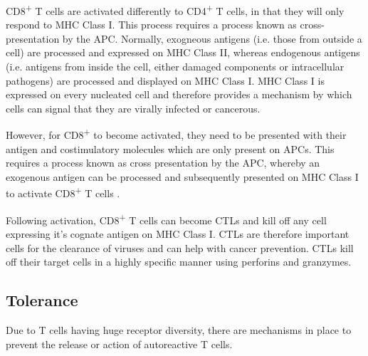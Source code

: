 CD8\textsuperscript{+} T cells are activated differently to CD4\textsuperscript{+} T cells, in that they will only respond to MHC Class I.
This process requires a process known as cross-presentation by the APC.
Normally, exogneous antigens (i.e. those from outside a cell) are processed and expressed on MHC Class II, whereas endogenous antigens (i.e. antigens from inside the cell, either damaged components or intracellular pathogens) are processed and displayed on MHC Class I.
MHC Class I is expressed on every nucleated cell and therefore provides a mechanism by which cells can signal that they are virally infected or cancerous.

However, for CD8\textsuperscript{+} to become activated, they need to be presented with their antigen and costimulatory molecules which are only present on APCs.
This requires a process known as cross presentation by the APC, whereby an exogenous antigen can be processed and subsequently presented on MHC Class I to activate CD8\textsuperscript{+} T cells \citep{Rock2005}.

Following activation, CD8\textsuperscript{+} T cells can become CTLs and kill off any cell expressing it's cognate antigen on MHC Class I.
CTLs are therefore important cells for the clearance of viruses and can help with cancer prevention.
CTLs kill off their target cells in a highly specific manner using perforins and granzymes.













\subsection{Tolerance}
\label{subsec:Tcelltolerance}

Due to T cells having huge receptor diversity, there are mechanisms in place to prevent the release or action of autoreactive T cells.

